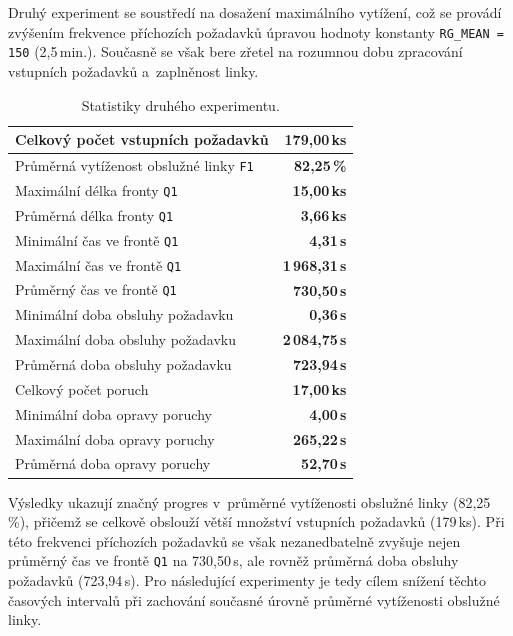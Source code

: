 \documentclass[a4paper, 11pt]{article}
\begin{document}
Druhý experiment se soustředí na dosažení maximálního vytížení, což se provádí zvýšením frekvence příchozích požadavků úpravou hodnoty konstanty \texttt{RG\_MEAN = 150} (2,5\,min.).
Současně se však bere zřetel na rozumnou dobu zpracování vstupních požadavků a~zaplněnost linky.

\begin{table}[ht!]
    \centering
    \begin{tabular}{|l|r|}
        \hline
        Celkový počet vstupních požadavků & \textbf{179,00\,ks} \\ \hline
        Průměrná vytíženost obslužné linky \texttt{F1} & \textbf{82,25\,\%} \\ \hline
        Maximální délka fronty \texttt{Q1} & \textbf{15,00\,ks} \\ \hline
        Průměrná délka fronty \texttt{Q1} & \textbf{3,66\,ks} \\ \hline
        Minimální čas ve frontě \texttt{Q1} & \textbf{4,31\,s} \\ \hline
        Maximální čas ve frontě \texttt{Q1} & \textbf{1\,968,31\,s} \\ \hline
        Průměrný čas ve frontě \texttt{Q1} & \textbf{730,50\,s} \\ \hline
        Minimální doba obsluhy požadavku & \textbf{0,36\,s} \\ \hline
        Maximální doba obsluhy požadavku & \textbf{2\,084,75\,s} \\ \hline
        Průměrná doba obsluhy požadavku & \textbf{723,94\,s} \\ \hline
        Celkový počet poruch & \textbf{17,00\,ks} \\ \hline
        Minimální doba opravy poruchy & \textbf{4,00\,s} \\ \hline
        Maximální doba opravy poruchy & \textbf{265,22\,s} \\ \hline
        Průměrná doba opravy poruchy & \textbf{52,70\,s} \\ \hline
    \end{tabular}
    \caption{Statistiky druhého experimentu.}
\end{table}

Výsledky ukazují značný progres v~průměrné vytíženosti obslužné linky (82,25\,\%), přičemž se celkově obslouží větší množství vstupních požadavků (179\,ks).
Při této frekvenci příchozích požadavků se však nezanedbatelně zvyšuje nejen průměrný čas ve frontě \texttt{Q1} na 730,50\,s, ale rovněž průměrná doba obsluhy požadavků (723,94\,s).
Pro následující experimenty je tedy cílem snížení těchto časových intervalů při zachování současné úrovně průměrné vytíženosti obslužné linky.
\end{document}

